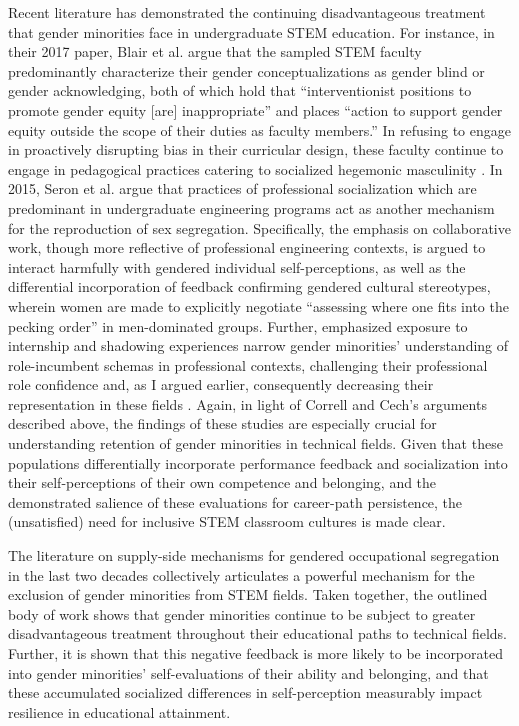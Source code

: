 Recent literature has demonstrated the continuing disadvantageous treatment that gender minorities face in undergraduate STEM education. For instance, in their 2017 paper, Blair et al. argue that the sampled STEM faculty predominantly characterize their gender conceptualizations as gender blind or gender acknowledging, both of which hold that ``interventionist positions to promote gender equity [are] inappropriate'' and places ``action to support gender equity outside the scope of their duties as faculty members.'' In refusing to engage in proactively disrupting bias in their curricular design, these faculty continue to engage in pedagogical practices catering to socialized hegemonic masculinity \cite{ohland_race_2011}. In 2015, Seron et al. argue that practices of professional socialization which are predominant in undergraduate engineering programs act as another mechanism for the reproduction of sex segregation. Specifically, the emphasis on collaborative work, though more reflective of professional engineering contexts, is argued to interact harmfully with gendered individual self-perceptions, as well as the differential incorporation of feedback confirming gendered cultural stereotypes, wherein women are made to explicitly negotiate ``assessing where one fits into the pecking order'' in men-dominated groups. Further, emphasized exposure to internship and shadowing experiences narrow gender minorities’ understanding of role-incumbent schemas in professional contexts, challenging their professional role confidence and, as I argued earlier, consequently decreasing their representation in these fields \cite{seron_persistence_2016}. Again, in light of Correll and Cech’s arguments described above, the findings of these studies are especially crucial for understanding retention of gender minorities in technical fields. Given that these populations differentially incorporate performance feedback and socialization into their self-perceptions of their own competence and belonging, and the demonstrated salience of these evaluations for career-path persistence, the (unsatisfied) need for inclusive STEM classroom cultures is made clear.  

The literature on supply-side mechanisms for gendered occupational segregation in the last two decades collectively articulates a powerful mechanism for the exclusion of gender minorities from STEM fields. Taken together, the outlined body of work shows that gender minorities continue to be subject to greater disadvantageous treatment throughout their educational paths to technical fields. Further, it is shown that this negative feedback is more likely to be incorporated into gender minorities’ self-evaluations of their ability and belonging, and that these accumulated socialized differences in self-perception measurably impact resilience in educational attainment.   

